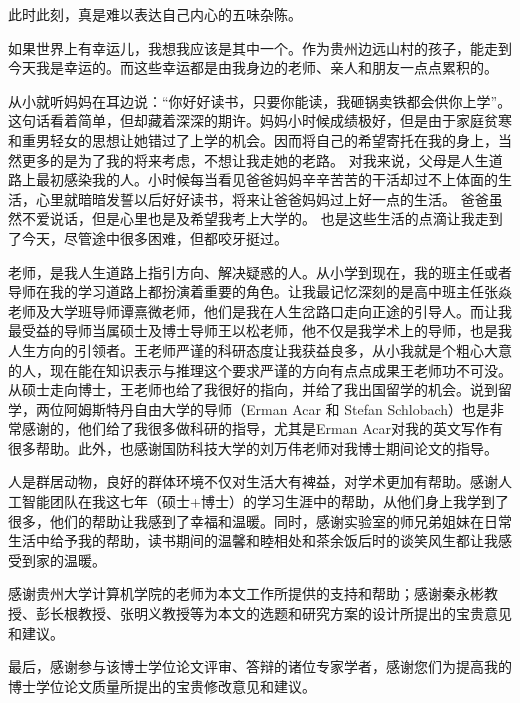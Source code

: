 \begin{thanks}
	
此时此刻，真是难以表达自己内心的五味杂陈。

如果世界上有幸运儿，我想我应该是其中一个。作为贵州边远山村的孩子，能走到今天我是幸运的。而这些幸运都是由我身边的老师、亲人和朋友一点点累积的。

从小就听妈妈在耳边说：“你好好读书，只要你能读，我砸锅卖铁都会供你上学”。这句话看着简单，但却藏着深深的期许。妈妈小时候成绩极好，但是由于家庭贫寒和重男轻女的思想让她错过了上学的机会。因而将自己的希望寄托在我的身上，当然更多的是为了我的将来考虑，不想让我走她的老路。
对我来说，父母是人生道路上最初感染我的人。小时候每当看见爸爸妈妈辛辛苦苦的干活却过不上体面的生活，心里就暗暗发誓以后好好读书，将来让爸爸妈妈过上好一点的生活。
爸爸虽然不爱说话，但是心里也是及希望我考上大学的。
也是这些生活的点滴让我走到了今天，尽管途中很多困难，但都咬牙挺过。

老师，是我人生道路上指引方向、解决疑惑的人。从小学到现在，我的班主任或者导师在我的学习道路上都扮演着重要的角色。让我最记忆深刻的是高中班主任张焱老师及大学班导师谭熹微老师，他们是我在人生岔路口走向正途的引导人。而让我最受益的导师当属硕士及博士导师王以松老师，他不仅是我学术上的导师，也是我人生方向的引领者。王老师严谨的科研态度让我获益良多，从小我就是个粗心大意的人，现在能在知识表示与推理这个要求严谨的方向有点点成果王老师功不可没。从硕士走向博士，王老师也给了我很好的指向，并给了我出国留学的机会。说到留学，两位阿姆斯特丹自由大学的导师（Erman Acar 和 Stefan Schlobach）也是非常感谢的，他们给了我很多做科研的指导，尤其是Erman Acar对我的英文写作有很多帮助。此外，也感谢国防科技大学的刘万伟老师对我博士期间论文的指导。

人是群居动物，良好的群体环境不仅对生活大有裨益，对学术更加有帮助。感谢人工智能团队在我这七年（硕士+博士）的学习生涯中的帮助，从他们身上我学到了很多，他们的帮助让我感到了幸福和温暖。同时，感谢实验室的师兄弟姐妹在日常生活中给予我的帮助，读书期间的温馨和睦相处和茶余饭后时的谈笑风生都让我感受到家的温暖。



感谢贵州大学计算机学院的老师为本文工作所提供的支持和帮助；感谢秦永彬教授、彭长根教授、张明义教授等为本文的选题和研究方案的设计所提出的宝贵意见和建议。



最后，感谢参与该博士学位论文评审、答辩的诸位专家学者，感谢您们为提高我的博士学位论文质量所提出的宝贵修改意见和建议。
	
	
\end{thanks}
